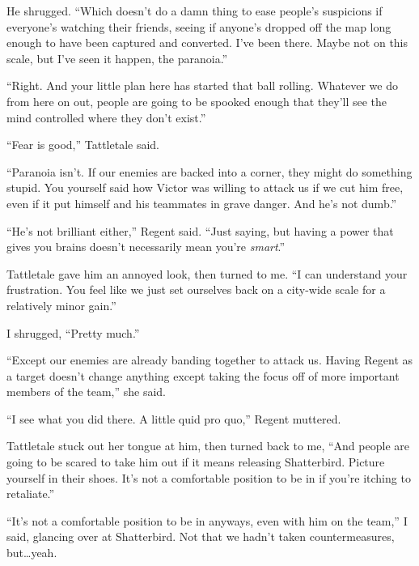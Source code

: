 He shrugged.  ``Which doesn't do a damn thing to ease people's suspicions if everyone's watching their friends, seeing if anyone's dropped off the map long enough to have been captured and converted.  I've been there.  Maybe not on this scale, but I've seen it happen, the paranoia.''



``Right.  And your little plan here has started that ball rolling.  Whatever we do from here on out, people are going to be spooked enough that they'll see the mind controlled where they don't exist.''



``Fear is good,'' Tattletale said.



``Paranoia isn't.  If our enemies are backed into a corner, they might do something stupid.  You yourself said how Victor was willing to attack us if we cut him free, even if it put himself and his teammates in grave danger.  And he's not dumb.''



``He's not brilliant either,'' Regent said.  ``Just saying, but having a power that gives you brains doesn't necessarily mean you're \emph{smart}.''



Tattletale gave him an annoyed look, then turned to me.  ``I can understand your frustration.  You feel like we just set ourselves back on a city-wide scale for a relatively minor gain.''



I shrugged, ``Pretty much.''



``Except our enemies are already banding together to attack us.  Having Regent as a target doesn't change anything except taking the focus off of more important members of the team,'' she said.



``I see what you did there.  A little quid pro quo,'' Regent muttered.



Tattletale stuck out her tongue at him, then turned back to me, ``And people are going to be scared to take him out if it means releasing Shatterbird.  Picture yourself in their shoes.  It's not a comfortable position to be in if you're itching to retaliate.''



``It's not a comfortable position to be in anyways, even with him on the team,'' I said, glancing over at Shatterbird.  Not that we hadn't taken countermeasures, but\ldots yeah.



